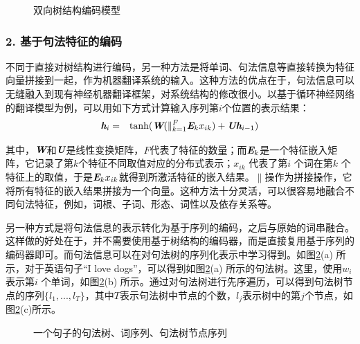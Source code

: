 \begin{figure}[htp]
\centering

\caption{双向树结构编码模型}
\label{fig:15-21}
\end{figure}


\subsubsection{2. 基于句法特征的编码}

\parinterval 不同于直接对树结构进行编码，另一种方法是将单词、句法信息等直接转换为特征向量拼接到一起，作为机器翻译系统的输入。这种方法的优点在于，句法信息可以无缝融入到现有神经机器翻译框架，对系统结构的修改很小。以基于循环神经网络的翻译模型为例，可以用如下方式计算输入序列第$i$个位置的表示结果：
\begin{eqnarray}
\textbf{\em h}_i &=& \textrm{tanh}(\textbf{\em W}(\|_{k=1}^{F}\textbf{\em E}_k x_{ik}) + \textbf{\em U}\textbf{\em h}_{i-1})
\label{eq:15-55}
\end{eqnarray}

\noindent 其中，$\textbf{\em W}$和$\textbf{\em U}$是线性变换矩阵，$F$代表了特征的数量；而$\textbf{\em E}_k$是一个特征嵌入矩阵，它记录了第$k$个特征不同取值对应的分布式表示；$x_{ik}$ 代表了第$i$ 个词在第$k$ 个特征上的取值，于是$\textbf{\em E}_k x_{ik}$就得到所激活特征的嵌入结果。$\|$操作为拼接操作，它将所有特征的嵌入结果拼接为一个向量。这种方法十分灵活，可以很容易地融合不同句法特征，例如，词根、子词、形态、词性以及依存关系等。

\parinterval 另一种方式是将句法信息的表示转化为基于序列的编码，之后与原始的词串融合。这样做的好处在于，并不需要使用基于树结构的编码器，而是直接复用基于序列的编码器即可。而句法信息可以在对句法树的序列化表示中学习得到。如图\ref{fig:15-22}(a) 所示，对于英语句子“I love dogs”，可以得到如图\ref{fig:15-22}(a) 所示的句法树。这里，使用$w_i$ 表示第$i$ 个单词，如图\ref{fig:15-22}(b) 所示。通过对句法树进行先序遍历，可以得到句法树节点的序列$\{l_1,...,l_T\}$，其中$T$表示句法树中节点的个数，$l_j$表示树中的第$j$个节点，如图\ref{fig:15-22}(c)所示。

\begin{figure}[htp]
\centering

\caption{一个句子的句法树、词序列、句法树节点序列}
\label{fig:15-22}
\end{figure}

